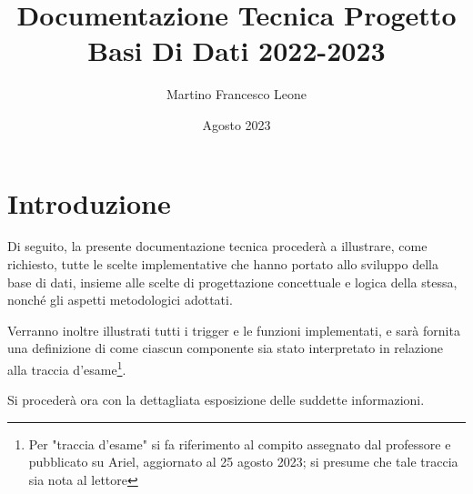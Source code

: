 \documentclass{article}
\title{Documentazione Tecnica Progetto Basi Di Dati 2022-2023}
\author{Martino Francesco Leone}
\date{Agosto 2023}
\begin{document}
\maketitle

\tableofcontents

\section{Introduzione}
Di seguito, la presente documentazione tecnica procederà a illustrare, come richiesto, tutte le scelte implementative che hanno portato allo sviluppo della base di dati, insieme alle scelte di progettazione concettuale e logica della stessa, nonché gli aspetti metodologici adottati.

Verranno inoltre illustrati tutti i trigger e le funzioni implementati, e sarà fornita una definizione di come ciascun componente sia stato interpretato in relazione alla traccia d'esame\footnote{Per "traccia d'esame" si fa riferimento al compito assegnato dal professore e pubblicato su Ariel, aggiornato al 25 agosto 2023; si presume che tale traccia sia nota al lettore}.

Si procederà ora con la dettagliata esposizione delle suddette informazioni.







\end{document}

